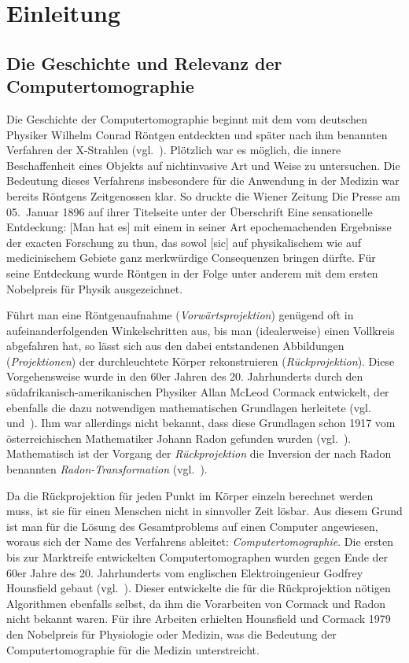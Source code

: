 \chapter{Einleitung}

\section{Die Geschichte und Relevanz der Computertomographie}

Die Geschichte der Computertomographie beginnt mit dem vom deutschen Physiker Wilhelm Conrad Röntgen entdeckten
und später nach ihm benannten Verfahren der {\glqq}X-Strahlen{\grqq} (vgl.~\cite{roentgen}). Plötzlich war es möglich,
die innere Beschaffenheit eines Objekts auf nichtinvasive Art und Weise zu untersuchen. Die Bedeutung dieses Verfahrens
insbesondere für die Anwendung in der Medizin war bereits Röntgens Zeitgenossen klar. So druckte die Wiener Zeitung
{\glqq}Die Presse{\grqq} am 05.\ Januar 1896 auf ihrer Titelseite unter der Überschrift {\glqq}Eine sensationelle
Entdeckung{\grqq}: {\glqq}[Man hat es] mit einem in seiner Art epochemachenden Ergebnisse der exacten Forschung zu thun,
das sowol [sic] auf physikalischem wie auf medicinischem Gebiete ganz merkwürdige Consequenzen bringen dürfte.{\grqq}
Für seine Entdeckung wurde Röntgen in der Folge unter anderem mit dem ersten Nobelpreis für Physik ausgezeichnet.

Führt man eine Röntgenaufnahme (\textit{Vorwärtsprojektion}) genügend oft in aufeinanderfolgenden Winkelschritten aus,
bis man (idealerweise) einen Vollkreis abgefahren hat, so lässt sich aus den dabei entstandenen Abbildungen
(\textit{Projektionen}) der durchleuchtete Körper rekonstruieren (\textit{Rückprojektion}). Diese Vorgehensweise wurde
in den 60er Jahren des 20. Jahrhunderts durch den südafrikanisch-amerikanischen Physiker Allan McLeod Cormack
entwickelt, der ebenfalls die dazu notwendigen mathematischen Grundlagen herleitete (vgl.~\cite{cormack63}
und~\cite{cormack64}). Ihm war allerdings nicht bekannt, dass diese Grundlagen schon 1917 vom österreichischen
Mathematiker Johann Radon gefunden wurden (vgl.~\cite{cormack79}). Mathematisch ist der Vorgang der
\textit{Rückprojektion} die Inversion der nach Radon benannten \textit{Radon-Transformation} (vgl.~\cite{radon}).

Da die Rückprojektion für jeden Punkt im Körper einzeln berechnet werden muss, ist sie für einen Menschen nicht in
sinnvoller Zeit lösbar. Aus diesem Grund ist man für die Lösung des Gesamtproblems auf einen Computer angewiesen, woraus
sich der Name des Verfahrens ableitet: \textit{Computertomographie}. Die ersten bis zur Marktreife entwickelten
Computertomographen wurden gegen Ende der 60er Jahre des 20. Jahrhunderts vom englischen Elektroingenieur Godfrey
Hounsfield gebaut (vgl.~\cite{houns}). Dieser entwickelte die für die Rückprojektion nötigen Algorithmen ebenfalls
selbst, da ihm die Vorarbeiten von Cormack und Radon nicht bekannt waren. Für ihre Arbeiten erhielten Hounsfield und
Cormack 1979 den Nobelpreis für Physiologie oder Medizin, was die Bedeutung der Computertomographie für die Medizin
unterstreicht.

